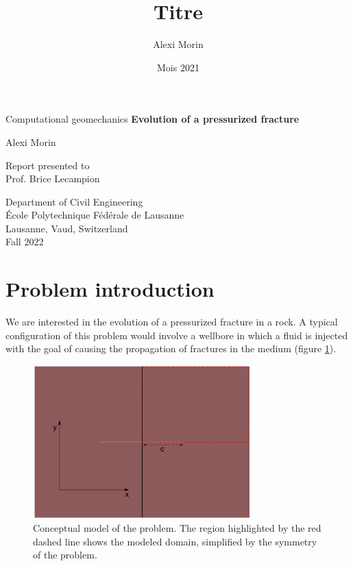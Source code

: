 \documentclass{article}
\title{Titre}
\author{Alexi Morin}
\date{Mois 2021}
\begin{document}
\begin{titlepage}
    \begin{center}
        \vspace*{1cm}
         \Huge  
        Computational geomechanics
         \vspace{0.5cm}
        \textbf{Evolution of a pressurized fracture}
         \vspace{0.5cm}
        \\ 
            
        \vspace{1.5cm}
            
        Alexi Morin
            
        \vfill
            
	Report presented to\\
	Prof. Brice Lecampion
  
        \vspace{2.cm}
            

        \Large

        Department of Civil Engineering\\
        École Polytechnique Fédérale de Lausanne\\
        Lausanne, Vaud, Switzerland\\
        Fall 2022
            
    \end{center}
\end{titlepage}


\section{Problem introduction}
We are interested in the evolution of a pressurized fracture in a rock. A typical configuration of this problem would involve a wellbore in which a fluid is injected with the goal of causing the propagation of fractures in the medium (figure \ref{fig:conceptual}). 

\begin{figure}[h]
    \centering
    \includegraphics[width=0.75\textwidth]{fracture}
    \caption{Conceptual model of the problem. The region highlighted by the red dashed line shows the modeled domain, simplified by the symmetry of the problem.}
    \label{fig:conceptual}
\end{figure}
\end{document}
